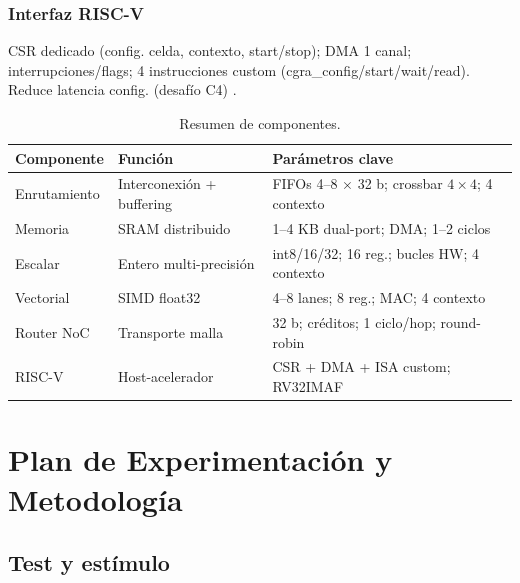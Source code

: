 \documentclass[conference]{IEEEtran}
\begin{document}
\subsubsection{Interfaz RISC-V}
CSR dedicado (config. celda, contexto, start/stop); DMA 1 canal; interrupciones/flags; 4 instrucciones custom (cgra\_config/start/wait/read). Reduce latencia config. (desafío C4) \cite{cgra_risc, dvhetero}.

\begin{table}[htbp]
\centering
\caption{Resumen de componentes.}
\label{tab:resumen_componentes}
\small
\begin{tabular}{@{}p{}p{}p{}@{}}
\toprule
\textbf{Componente} & \textbf{Función} & \textbf{Parámetros clave} \\
\midrule
Enrutamiento & Interconexión + buffering & FIFOs 4–8 $\times$ 32 b; crossbar $4\times4$; 4 contexto \\
Memoria & SRAM distribuido & 1–4 KB dual-port; DMA; 1–2 ciclos \\
Escalar & Entero multi-precisión & int8/16/32; 16 reg.; bucles HW; 4 contexto \\
Vectorial & SIMD float32 & 4–8 lanes; 8 reg.; MAC; 4 contexto \\
Router NoC & Transporte malla & 32 b; créditos; 1 ciclo/hop; round-robin \\
RISC-V & Host-acelerador & CSR + DMA + ISA custom; RV32IMAF \\
\bottomrule
\end{tabular}
\end{table}

\section{Plan de Experimentación y Metodología}%
\label{sec:experimento}
\subsection{Test y estímulo}
\end{document}
